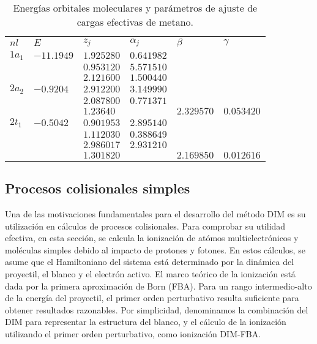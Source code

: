 \begin{table}[t]
\centering
\begin{tabular}{
>{\centering\arraybackslash}p{}
>{\centering\arraybackslash}p{}
>{\centering\arraybackslash}p{}
>{\centering\arraybackslash}p{}
>{\centering\arraybackslash}p{}
>{\centering\arraybackslash}p{}}
\rowcolor{mydarkgray} 
   $nl$ & $E$        & $z_j$        & $\alpha_j$   & $\beta$&$\gamma$\\
$1a_1$  & $-11.1949$ & $1.925280$ & $0.641982$ & & \\
\rowcolor{mygray} 
        &            & $0.953120$ & $5.571510$ & & \\
        &            & $2.121600$ & $1.500440$ & & \\
\rowcolor{mygray} 
$2a_2$  & $-0.9204$  & $2.912200$ & $3.149990$ & & \\
        &            & $2.087800$ & $0.771371$ & & \\
\rowcolor{mygray} 
        &            & $1.23640$  &            & $2.329570$&$0.053420$\\
$2t_1$  & $-0.5042$  & $0.901953$ & $2.895140$ & & \\
\rowcolor{mygray} 
        &            & $1.112030$ & $0.388649$ & & \\
        &            & $2.986017$ & $2.931210$ & & \\
\rowcolor{mygray} 
        &            & $1.301820$ &            & $2.169850$&$0.012616$\\ 
\end{tabular}
\caption[Energías y parámetros de ajuste de cargas efectivas de metano.]
{Energías orbitales moleculares y parámetros de ajuste de cargas 
efectivas de metano.}
\label{tab:ch4parameters}
\end{table}

\subsection{Procesos colisionales simples}
\label{subsec:procol}

Una de las motivaciones fundamentales para el desarrollo del método DIM 
es su utilización en cálculos de procesos colisionales. Para comprobar 
su utilidad efectiva, en esta sección, se calcula la ionización de 
atómos multielectrónicos y moléculas simples debido al impacto de 
protones y fotones. En estos cálculos, se asume que el Hamiltoniano del 
sistema está determinado por la dinámica del proyectil, el blanco y el 
electrón activo. El marco teórico de la ionización está dada por la 
primera aproximación de Born (FBA). Para un rango intermedio-alto de la 
energía del proyectil, el primer orden perturbativo resulta suficiente 
para obtener resultados razonables. Por simplicidad, denominamos la 
combinación del DIM para representar la estructura del blanco, y el 
cálculo de la ionización utilizando el primer orden perturbativo, como 
ionización DIM-FBA. 

